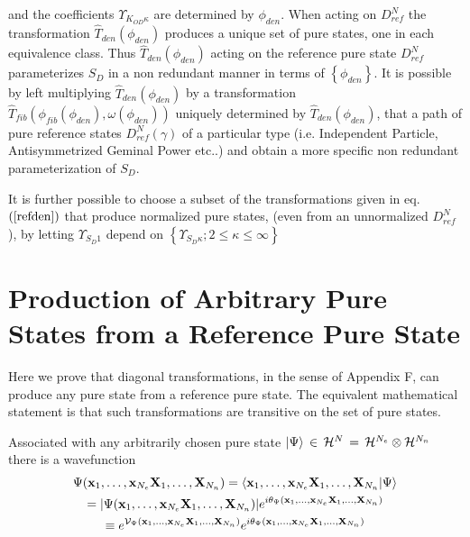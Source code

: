 and the coefficients $\Upsilon _{K_{OD}\kappa }$ are determined by $\phi
_{den}$. When acting on $D_{ref}^{N}$ the transformation $\hat{T}%
_{den}\left( \phi _{den}\right) $ produces a unique set of pure states, one
in each equivalence class. Thus $\hat{T}_{den}\left( \phi _{den}\right) $
acting on the reference pure state $D_{ref}^{N}$ parameterizes $S_{D}$ in a
non redundant manner in terms of $\left\{ \phi _{den}\right\} $. It is
possible by left multiplying $\hat{T}_{den}\left( \phi _{den}\right) $ by a
transformation $\hat{T}_{fib}\left( \phi _{fib}\left( \phi _{den}\right)
,\omega \left( \phi _{den}\right) \right) $ uniquely determined by $\hat{T}%
_{den}\left( \phi _{den}\right) $, that a path of pure reference states $%
D_{ref}^{N}\left( \gamma \right) $ of a particular type (i.e. Independent
Particle, Antisymmetrized Geminal Power etc..) and obtain a more specific
non redundant parameterization of $S_{D}$.

It is further possible to choose a subset of the transformations given in
eq. $\left( \ref{refden}\right) $ that produce normalized pure states, (even
from an unnormalized $D_{ref}^{N}$), by letting $\Upsilon _{S_{D}1}$ depend
on $\left\{ \Upsilon _{S_{D}\kappa };2\leq \kappa \leq \infty \right\} $

\section{Production of Arbitrary Pure States from a Reference Pure State}

\noindent Here we prove that diagonal transformations, in the sense of
Appendix F, can produce any pure state from a reference pure state. The
equivalent mathematical statement is that such transformations are
transitive on the set of pure states.

Associated with any arbitrarily chosen pure state $|\Psi \rangle \,\in \,%
{\cal H}^{N}\,=\,{\cal H}^{N_{e}}\otimes {\cal H}^{N_{n}}$ there is a
wavefunction 
\begin{gather}
\Psi ({\bf x}_{1},\ldots ,{\bf x}_{N_{e}}{\bf X}_{1},\ldots ,{\bf X}%
_{N_{n}})=\langle {\bf x}_{1},\ldots ,{\bf x}_{N_{e}}{\bf X}_{1},\ldots ,%
{\bf X}_{N_{n}}|\Psi \rangle  \nonumber \\
=|\Psi ({\bf x}_{1},\ldots ,{\bf x}_{N_{e}}{\bf X}_{1},\ldots ,{\bf X}%
_{N_{n}})|e^{i\theta _{\Psi }({\bf x}_{1},\ldots ,{\bf x}_{N_{e}}{\bf X}%
_{1},\ldots ,{\bf X}_{N_{n}})}  \nonumber \\
\equiv e^{{\cal V}_{\Psi }({\bf x}_{1},\ldots ,{\bf x}_{N_{e}}{\bf X}%
_{1},\ldots ,{\bf X}_{N_{n}})}e^{i\theta _{\Psi }({\bf x}_{1},\ldots ,{\bf x}%
_{N_{e}}{\bf X}_{1},\ldots ,{\bf X}_{N_{n}})}  \label{psipolar}
\end{gather}

